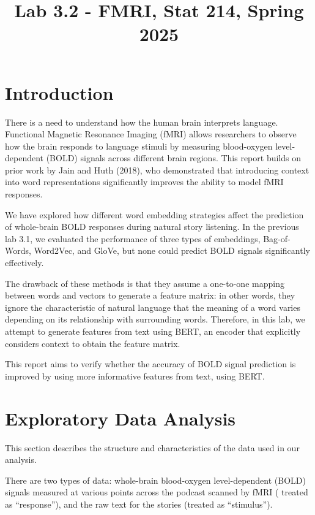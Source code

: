 \documentclass[12pt,letterpaper]{article}
\title{Lab 3.2 - FMRI, Stat 214, Spring 2025\vspace{-2em}}
\begin{document}
\maketitle


\section{Introduction}

There is a need to understand how the human brain interprets language. Functional Magnetic Resonance Imaging (fMRI) allows researchers to observe how the brain responds to language stimuli by measuring blood-oxygen level-dependent (BOLD) signals across different brain regions. This report builds on prior work by Jain and Huth (2018), who demonstrated that introducing context into word representations significantly improves the ability to model fMRI responses. 

We have explored how different word embedding strategies affect the prediction of whole-brain BOLD responses during natural story listening. In the previous lab 3.1, we evaluated the performance of three types of embeddings, Bag-of-Words, Word2Vec, and GloVe, but none could predict BOLD signals significantly effectively. 

The drawback of these methods is that they assume a one-to-one mapping between words and vectors to generate a feature matrix: in other words, they ignore the characteristic of natural language that the meaning of a word varies depending on its relationship with surrounding words. Therefore, in this lab, we attempt to generate features from text using BERT, an encoder that explicitly considers context to obtain the feature matrix. 

This report aims to verify whether the accuracy of BOLD signal prediction is improved by using more informative features from text, using BERT.

\section{Exploratory Data Analysis}

This section describes the structure and characteristics of the data used in our analysis.

There are two types of data: whole-brain blood-oxygen level-dependent (BOLD) signals measured at various points across the podcast scanned by fMRI ( treated as “response”), and the raw text for the stories (treated as “stimulus”).
\end{document}
